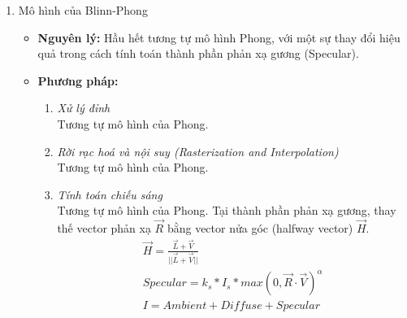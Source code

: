 \begin{enumerate}
\begin{itemize}
		Màu sắc của vật thể trong mô hình Phong thường được gán trực tiếp cho các hệ số \(k_d\) và đôi khi \(k_a\), trong khi thành phần specular thường được giả định có màu trắng hoặc một màu cố định, không phụ thuộc vào màu sắc thực của vật liệu. Do đó, màu sắc quan sát được không phải là kết quả của sự tương tác giữa ánh sáng và vật chất, mà là kết quả của việc nhân các hệ số màu thực nghiệm với cường độ nguồn sáng.
		
		Cách biểu diễn này dẫn đến nhiều hạn chế về mặt vật lý, bao gồm việc không bảo toàn năng lượng, khó phân biệt một cách nhất quán giữa các loại vật liệu khác nhau, và không thể tái hiện các hiệu ứng phụ thuộc góc quan sát. Mặc dù vậy, nhờ tính đơn giản và hiệu quả tính toán, mô hình Phong vẫn giữ vai trò quan trọng trong lịch sử phát triển của đồ họa máy tính, đồng thời tạo tiền đề cho sự ra đời của các mô hình chiếu sáng dựa trên vật lý và các biểu diễn BRDF hiện đại.
		
	\end{itemize}
	
	\item Mô hình của Blinn-Phong
	\begin{itemize}
		\item \textbf{Nguyên lý:} Hầu hết tương tự mô hình Phong, với một sự thay đổi hiệu quả trong cách tính toán thành phần phản xạ gương (Specular)\cite{blinn_phong3}.
		
		\item \textbf{Phương pháp:}
		\begin{enumerate}
			\item \textit{Xử lý đỉnh}\\
			Tương tự mô hình của Phong.
			
			\item \textit{Rời rạc hoá và nội suy (Rasterization and Interpolation)}\\
			Tương tự mô hình của Phong.
			
			\item \textit{Tính toán chiếu sáng}\\
			Tương tự mô hình của Phong. Tại thành phần phản xạ gương, thay thế vector phản xạ $\vec{R}$ bằng vector nửa góc (halfway vector) $\vec{H}$.
			\begin{gather*}
				\vec{H} = \frac{\vec{L} + \vec{V}}{||\vec{L} + \vec{V}||}\\
				Specular = k_s * I_s * max(0, \vec{R} \cdot \vec{V})^\alpha\\
				I = Ambient + Diffuse + Specular
			\end{gather*}
			

\end{enumerate}
\end{itemize}
\end{enumerate}
